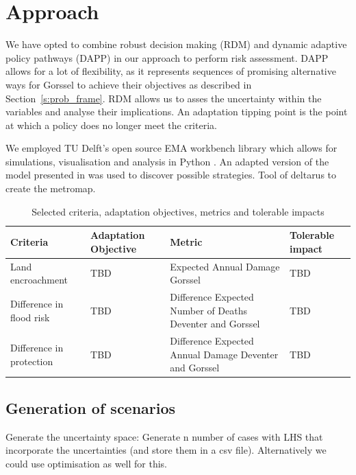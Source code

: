 \section{Approach}
\label{s:approach}



We have opted to combine robust decision making (RDM) and dynamic adaptive policy pathways (DAPP) in our approach to perform risk assessment. DAPP allows for a lot of flexibility, as it represents sequences of promising alternative ways for Gorssel to achieve their objectives as described in Section~\ref{s:prob_frame}. RDM allows us to asses the uncertainty within the variables and analyse their implications. An adaptation tipping point is the point at which a policy does no longer meet the criteria.

We employed TU Delft's open source EMA workbench library which allows for simulations, visualisation and analysis in Python \parencite{kwakkel_exploratory_2017}. An adapted version of the model presented in  was used to discover possible strategies. Tool of deltarus to create the metromap.

\begin{longtable}[c]{lp{2cm}p{3cm}l}
\caption{Selected criteria, adaptation objectives, metrics and tolerable impacts}
\label{tab:criteria}\\
\textbf{Criteria}        & \textbf{Adaptation Objective} & \textbf{Metric}                                           & \textbf{Tolerable impact} \\
\hline
\endfirsthead
%
\endhead
%
Land encroachment & TBD & Expected Annual Damage Gorssel & TBD \\
Difference in flood risk & TBD & Difference Expected Number of Deaths Deventer and Gorssel & TBD\\
Difference in protection & TBD & Difference Expected Annual Damage Deventer and Gorssel & TBD
\end{longtable}


\subsection{Generation of scenarios}
Generate the uncertainty space: Generate n number of cases with LHS that incorporate the uncertainties (and store them in a csv file). Alternatively we could use optimisation as well for this.


